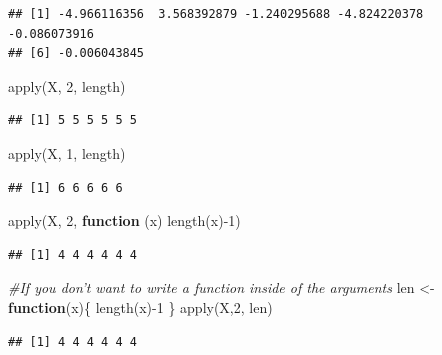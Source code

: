 \documentclass[
]{book}
\newenvironment{Shaded}{\begin{snugshade}}{\end{snugshade}}
\newcommand{\CommentTok}[1]{\textcolor[rgb]{0.56,0.35,0.01}{\textit{#1}}}
\newcommand{\ControlFlowTok}[1]{\textcolor[rgb]{0.13,0.29,0.53}{\textbf{#1}}}
\newcommand{\DecValTok}[1]{\textcolor[rgb]{0.00,0.00,0.81}{#1}}
\newcommand{\FunctionTok}[1]{\textcolor[rgb]{0.00,0.00,0.00}{#1}}
\newcommand{\NormalTok}[1]{#1}
\newcommand{\OtherTok}[1]{\textcolor[rgb]{0.56,0.35,0.01}{#1}}
\newcommand{\SpecialCharTok}[1]{\textcolor[rgb]{0.00,0.00,0.00}{#1}}
\begin{document}
\begin{verbatim}
## [1] -4.966116356  3.568392879 -1.240295688 -4.824220378 -0.086073916
## [6] -0.006043845
\end{verbatim}

\begin{Shaded}
\begin{Highlighting}[]
\FunctionTok{apply}\NormalTok{(X, }\DecValTok{2}\NormalTok{, length)}
\end{Highlighting}
\end{Shaded}

\begin{verbatim}
## [1] 5 5 5 5 5 5
\end{verbatim}

\begin{Shaded}
\begin{Highlighting}[]
\FunctionTok{apply}\NormalTok{(X, }\DecValTok{1}\NormalTok{, length)}
\end{Highlighting}
\end{Shaded}

\begin{verbatim}
## [1] 6 6 6 6 6
\end{verbatim}

\begin{Shaded}
\begin{Highlighting}[]
\FunctionTok{apply}\NormalTok{(X, }\DecValTok{2}\NormalTok{, }\ControlFlowTok{function}\NormalTok{ (x) }\FunctionTok{length}\NormalTok{(x)}\SpecialCharTok{{-}}\DecValTok{1}\NormalTok{)}
\end{Highlighting}
\end{Shaded}

\begin{verbatim}
## [1] 4 4 4 4 4 4
\end{verbatim}

\begin{Shaded}
\begin{Highlighting}[]
\CommentTok{\#If you don’t want to write a function inside of the arguments}
\NormalTok{len }\OtherTok{\textless{}{-}} \ControlFlowTok{function}\NormalTok{(x)\{}
  \FunctionTok{length}\NormalTok{(x)}\SpecialCharTok{{-}}\DecValTok{1}
\NormalTok{\}}
\FunctionTok{apply}\NormalTok{(X,}\DecValTok{2}\NormalTok{, len)}
\end{Highlighting}
\end{Shaded}

\begin{verbatim}
## [1] 4 4 4 4 4 4
\end{verbatim}
\end{document}
